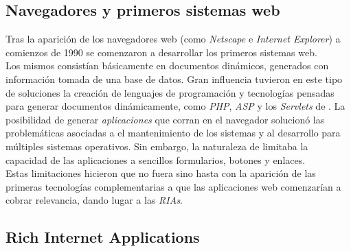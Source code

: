 \subsection{Navegadores y primeros sistemas web}
\label{subsec:history:about_web:web}

Tras la aparición de los navegadores web (como \emph{Netscape} e
\emph{Internet Explorer}) a comienzos de 1990 se comenzaron a desarrollar los 
primeros sistemas web.\\
Los mismos consistían básicamente en documentos dinámicos, generados con 
información tomada de una base de datos. Gran influencia tuvieron en este tipo 
de soluciones la creación de lenguajes de programación y tecnologías pensadas 
para generar documentos \html dinámicamente, como \emph{PHP}, \emph{ASP} y los 
\emph{Servlets} de \java {}. La posibilidad de 
generar \emph{aplicaciones} que corran en el navegador solucionó las
problemáticas asociadas a el mantenimiento de los sistemas y al desarrollo para 
múltiples sistemas operativos. Sin embargo, la naturaleza de \html limitaba la 
capacidad de las aplicaciones a sencillos formularios, botones y enlaces.\\
Estas limitaciones hicieron que no fuera sino hasta con la aparición de las 
primeras tecnologías complementarias a \html que las aplicaciones web 
comenzarían a cobrar relevancia, dando lugar a las \emph{RIAs}.

\subsection{Rich Internet Applications}
\label{subsec:history:about_web:rias}

